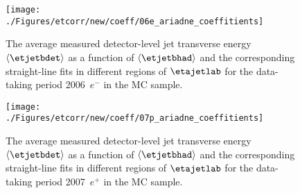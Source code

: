 \begin{figure}[p]
\centering
\texttt{[image: ./Figures/etcorr/new/coeff/06e\_ariadne\_coeffitients]}
\caption{The average measured detector-level jet transverse energy $\left\langle\etjetbdet\right\rangle$ as a function of $\left\langle\etjetbhad\right\rangle$ and the corresponding straight-line fits in different regions of $\etajetlab$ for the data-taking period 2006~$e^-$ in the \ariadne MC sample.}
\label{fig:06e_ariadne_coeffitients}
\end{figure}

\begin{figure}[p]
\centering
\texttt{[image: ./Figures/etcorr/new/coeff/07p\_ariadne\_coeffitients]}
\caption{The average measured detector-level jet transverse energy $\left\langle\etjetbdet\right\rangle$ as a function of $\left\langle\etjetbhad\right\rangle$ and the corresponding straight-line fits in different regions of $\etajetlab$ for the data-taking period 2007~$e^+$ in the \ariadne MC sample.}
\label{fig:07p_ariadne_coeffitients}
\end{figure}